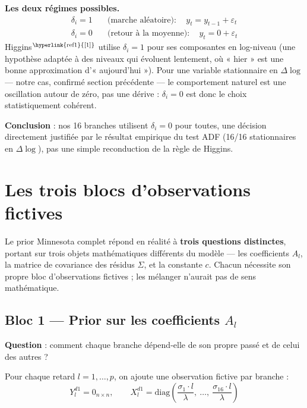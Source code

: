 \documentclass[11pt,a4paper]{article}
\newcommand{\cit}[1]{\textsuperscript{\hyperlink{ref#1}{[#1]}}}
\begin{document}
\begin{definitionbox}
\textbf{Les deux régimes possibles.}
\begin{align*}
\delta_i = 1 &\quad\text{(marche aléatoire)} : \quad y_t = y_{t-1} + \varepsilon_t \\
\delta_i = 0 &\quad\text{(retour à la moyenne)} : \quad y_t = 0 + \varepsilon_t
\end{align*}
Higgins$\cit{1}$ utilise $\delta_i=1$ pour ses composantes en log-niveau (une hypothèse adaptée à des niveaux qui évoluent lentement, où « hier » est une bonne approximation d'« aujourd'hui »). Pour une variable stationnaire en $\Delta\log$ --- notre cas, confirmé section précédente --- le comportement naturel est une oscillation autour de zéro, pas une dérive : $\delta_i=0$ est donc le choix statistiquement cohérent.
\end{definitionbox}

\begin{resultatbox}
\textbf{Conclusion} : nos 16 branches utilisent $\delta_i=0$ pour toutes, une décision directement justifiée par le résultat empirique du test ADF (16/16 stationnaires en $\Delta\log$), pas une simple reconduction de la règle de Higgins.
\end{resultatbox}

\section{Les trois blocs d'observations fictives}

Le prior Minnesota complet répond en réalité à \textbf{trois questions distinctes}, portant sur trois objets mathématiques différents du modèle --- les coefficients $A_l$, la matrice de covariance des résidus $\Sigma$, et la constante $c$. Chacun nécessite son propre bloc d'observations fictives ; les mélanger n'aurait pas de sens mathématique.

\subsection{Bloc 1 --- Prior sur les coefficients $A_l$}

\textbf{Question} : comment chaque branche dépend-elle de son propre passé et de celui des autres ?

Pour chaque retard $l=1,\dots,p$, on ajoute une observation fictive par branche :
\begin{equation}
Y^{d1}_l = 0_{n\times n}, \qquad X^{d1}_l = \text{diag}\left(\frac{\sigma_1\cdot l}{\lambda}, \ \dots, \ \frac{\sigma_{16}\cdot l}{\lambda}\right)
\label{eq:bloc1}
\end{equation}
\end{document}
